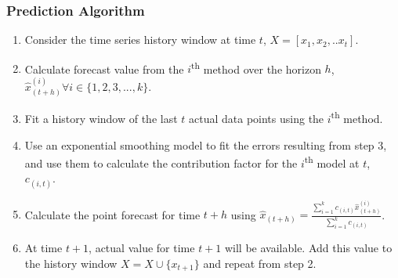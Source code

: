 \subsubsection{Prediction Algorithm}

\begin{enumerate}
\item Consider the time series history window at time $t$, $X=[x_{1},x_{2},.. x_{t}]$.
\item Calculate forecast value from the $i$\textsuperscript{th} method over the horizon $h$, $\hat{x}_{(t+h)}^{(i)} \forall i \in \{1,2,3,...,k\}$.
\item Fit a history window of the last $t$ actual data points using the $i$\textsuperscript{th} method.
\item Use an exponential smoothing model to fit the errors resulting from step 3, and use them to calculate the contribution factor for the $i$\textsuperscript{th} model at $t$, $c_{(i,t)}$.
\item Calculate the point forecast for time $t+h$ using
$\hat{x}_{(t+h)}= \frac{\sum_{i=1}^{k}c_{(i,t)} \hat{x}_{(t+h)}^{(i)}}{\sum_{i=1}^{k}c_{(i,t)}}$.
\item At time $t+1$, actual value for time $t+1$ will be available. Add this value to the history window $X=X\cup \{x_{t+1}\}$ and repeat from step 2.
\end{enumerate}